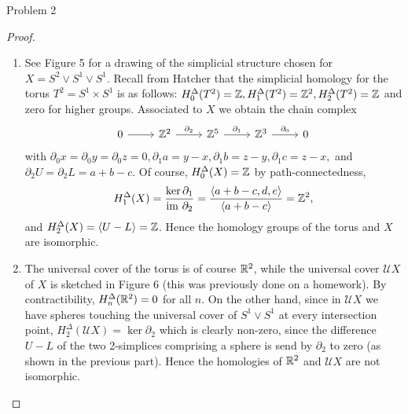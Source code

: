 \documentclass{../mathnotes}
\begin{document}
\begin{prop}
    Problem 2
\end{prop}
\begin{proof}\hfill
\begin{enumerate}
    \item See Figure 5 for a drawing of the simplicial structure chosen for $X=S^2\vee S^1\vee S^1$.
        Recall from Hatcher that the simplicial homology for the torus $T^2=S^1\times S^1$ is as follows:
        $H_0^\Delta(T^2)=\mathbb{Z}, H_1^\Delta(T^2)=\mathbb{Z}^2, H_2^\Delta(T^2)=\mathbb{Z}$ and zero for higher groups.
        Associated to $X$ we obtain the chain complex 
        \begin{equation*}
            \begin{tikzcd}
                0\ar{r} & \Z^2\ar{r}{\partial_2} & \Z^5\ar{r}{\partial_1} & \Z^3\ar{r}{\partial_0} & 0
            \end{tikzcd}
        \end{equation*}
        with $ \partial_0x=\partial_0y=\partial_0z=0,\partial_1a=y-x,\partial_1b=z-y, \partial_1c=z-x,$ and $\partial_2U=\partial_2L=a+b-c.$
        Of course, $H^\Delta_0(X)=\mathbb{Z}$ by path-connectedness,
        \[H_1^\Delta(X)=\frac{\ker \partial_1}{\text{im }\partial_2}=\frac{\langle a+b-c,d,e\rangle}{\langle a+b-c\rangle}=\mathbb{Z}^2,\]
        and $H^\Delta_2(X)=\langle U-L\rangle=\mathbb{Z}$. Hence the homology groups of the torus and $X$ are isomorphic.
    \item The universal cover of the torus is of course $\mathbb{R}^2$, while the universal cover $\mathcal{U}X$ of $X$ is sketched in Figure 6
        (this was previously done on a homework). By contractibility, $H^\Delta_n(\mathbb{R}^2)=0$ for all $n$. On the
        other hand, since in $\mathcal{U}X$ we have spheres touching the universal cover of $S^1\vee S^1$
        at every intersection point, $H^\Delta_2(\mathcal{U}X)=\ker\partial_2$ which is clearly non-zero, since the difference $U-L$
        of the two 2-simplices comprising a sphere is send by $\partial_2$ to zero (as shown in the previous part). Hence the homologies
        of $\mathbb{R}^2$ and $\mathcal{U}X$ are not isomorphic.
\end{enumerate}
\end{proof}
\end{document}
